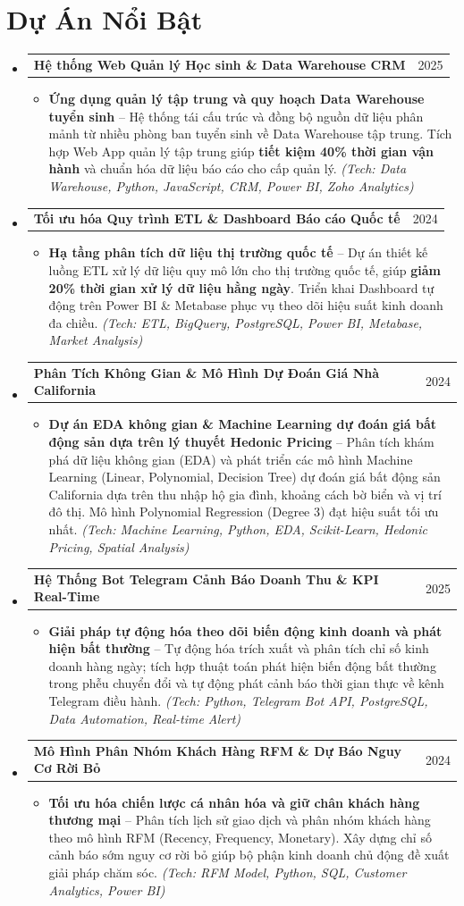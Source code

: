 \documentclass[letterpaper,11pt]{article}
\makeatletter
\newcommand{\resumeItem}[1]{
  \item\small{
    {#1 \vspace{1pt}}
  }
}
\newcommand{\resumeProjectHeading}[2]{
    \vspace{2pt}\item
    \begin{tabular*}{\textwidth}{l@{\extracolsep{\fill}}r}
      \small#1 & #2 \\
    \end{tabular*}\vspace{-2pt}
}
\newcommand{\resumeSubHeadingListStart}{\begin{itemize}[leftmargin=0.15in, label={}]}
\newcommand{\resumeSubHeadingListEnd}{\end{itemize}}
\newcommand{\resumeItemListStart}{\begin{itemize}[leftmargin=0.15in, itemsep=2.5pt, topsep=2pt, parsep=1.5pt]}
\newcommand{\resumeItemListEnd}{\end{itemize}\vspace{2pt}}
\makeatother
\begin{document}
\section*{Dự Án Nổi Bật}
  \resumeSubHeadingListStart
        \resumeProjectHeading
      {\textbf{Hệ thống Web Quản lý Học sinh \& Data Warehouse CRM}}{2025}
      \resumeItemListStart
        \resumeItem{\textbf{Ứng dụng quản lý tập trung và quy hoạch Data Warehouse tuyển sinh} -- Hệ thống tái cấu trúc và đồng bộ nguồn dữ liệu phân mảnh từ nhiều phòng ban tuyển sinh về Data Warehouse tập trung. Tích hợp Web App quản lý tập trung giúp \textbf{tiết kiệm 40\% thời gian vận hành} và chuẩn hóa dữ liệu báo cáo cho cấp quản lý. \emph{(Tech: Data Warehouse, Python, JavaScript, CRM, Power BI, Zoho Analytics)}}
      \resumeItemListEnd
    \resumeProjectHeading
      {\textbf{Tối ưu hóa Quy trình ETL \& Dashboard Báo cáo Quốc tế}}{2024}
      \resumeItemListStart
        \resumeItem{\textbf{Hạ tầng phân tích dữ liệu thị trường quốc tế} -- Dự án thiết kế luồng ETL xử lý dữ liệu quy mô lớn cho thị trường quốc tế, giúp \textbf{giảm 20\% thời gian xử lý dữ liệu hằng ngày}. Triển khai Dashboard tự động trên Power BI \& Metabase phục vụ theo dõi hiệu suất kinh doanh đa chiều. \emph{(Tech: ETL, BigQuery, PostgreSQL, Power BI, Metabase, Market Analysis)}}
      \resumeItemListEnd
    \resumeProjectHeading
      {\textbf{Phân Tích Không Gian \& Mô Hình Dự Đoán Giá Nhà California}}{2024}
      \resumeItemListStart
        \resumeItem{\textbf{Dự án EDA không gian \& Machine Learning dự đoán giá bất động sản dựa trên lý thuyết Hedonic Pricing} -- Phân tích khám phá dữ liệu không gian (EDA) và phát triển các mô hình Machine Learning (Linear, Polynomial, Decision Tree) dự đoán giá bất động sản California dựa trên thu nhập hộ gia đình, khoảng cách bờ biển và vị trí đô thị. Mô hình Polynomial Regression (Degree 3) đạt hiệu suất tối ưu nhất. \emph{(Tech: Machine Learning, Python, EDA, Scikit-Learn, Hedonic Pricing, Spatial Analysis)}}
      \resumeItemListEnd
    \resumeProjectHeading
      {\textbf{Hệ Thống Bot Telegram Cảnh Báo Doanh Thu \& KPI Real-Time}}{2025}
      \resumeItemListStart
        \resumeItem{\textbf{Giải pháp tự động hóa theo dõi biến động kinh doanh và phát hiện bất thường} -- Tự động hóa trích xuất và phân tích chỉ số kinh doanh hàng ngày; tích hợp thuật toán phát hiện biến động bất thường trong phễu chuyển đổi và tự động phát cảnh báo thời gian thực về kênh Telegram điều hành. \emph{(Tech: Python, Telegram Bot API, PostgreSQL, Data Automation, Real-time Alert)}}
      \resumeItemListEnd
    \resumeProjectHeading
      {\textbf{Mô Hình Phân Nhóm Khách Hàng RFM \& Dự Báo Nguy Cơ Rời Bỏ}}{2024}
      \resumeItemListStart
        \resumeItem{\textbf{Tối ưu hóa chiến lược cá nhân hóa và giữ chân khách hàng thương mại} -- Phân tích lịch sử giao dịch và phân nhóm khách hàng theo mô hình RFM (Recency, Frequency, Monetary). Xây dựng chỉ số cảnh báo sớm nguy cơ rời bỏ giúp bộ phận kinh doanh chủ động đề xuất giải pháp chăm sóc. \emph{(Tech: RFM Model, Python, SQL, Customer Analytics, Power BI)}}
      \resumeItemListEnd
  \resumeSubHeadingListEnd
\end{document}

